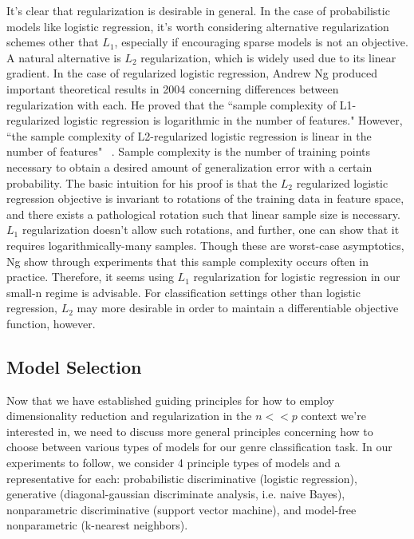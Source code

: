 \documentclass[]{article}
\begin{document}
	It's clear that regularization is desirable in general. In the case of probabilistic models like logistic regression, it's worth considering alternative regularization schemes other that $L_1$, especially if encouraging sparse models is not an objective. A natural alternative is $L_2$ regularization, which is widely used due to its linear gradient. In the case of regularized logistic regression, Andrew Ng produced important theoretical results in 2004 concerning differences between regularization with each. He proved that the ``sample complexity of L1-regularized logistic regression is logarithmic in the number of features." However,  ``the sample complexity of L2-regularized logistic regression is linear in the number of features"  ~\cite{ng2004feature}. Sample complexity is the number of training points necessary to obtain a desired amount of generalization error with a certain probability. The basic intuition for his proof is that the $L_2$ regularized logistic regression objective is invariant to rotations of the training data in feature space, and there exists a pathological rotation such that linear sample size is necessary. $L_1$ regularization doesn't allow such rotations, and further, one can show that it requires logarithmically-many samples. Though these are worst-case asymptotics, Ng show through experiments that  this sample complexity occurs often in practice. Therefore, it seems using $L_1$ regularization for logistic regression in our small-n regime is advisable. For classification settings other than logistic regression, $L_2$ may more desirable in order to maintain a differentiable objective function, however. 

\subsection{Model Selection}
	Now that we have established guiding principles for how to employ dimensionality reduction and regularization in the $n << p$ context we're interested in, we need to discuss more general principles concerning how to choose between various types of models for our genre classification task. In our experiments to follow, we consider 4 principle types of models and a representative for each: probabilistic discriminative (logistic regression), generative (diagonal-gaussian discriminate analysis, i.e. naive Bayes), nonparametric discriminative (support vector machine), and model-free nonparametric (k-nearest neighbors). 
\end{document}
